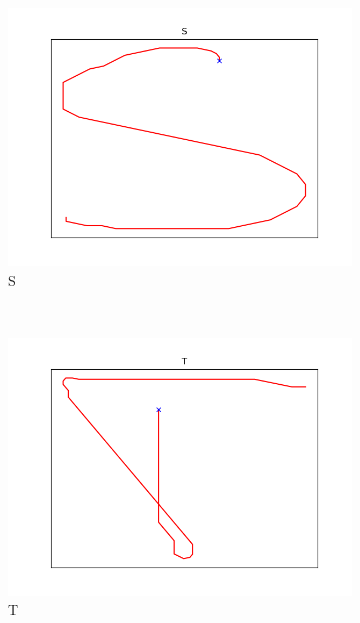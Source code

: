\begin{figure}
\begin{subfigure}[b]{0.14\textwidth}
        \includegraphics[width=\textwidth]{images/gbem/letters_generated/S.png}
        \caption{S}
    \end{subfigure}
    ~
    \begin{subfigure}[b]{0.14\textwidth}
        \includegraphics[width=\textwidth]{images/gbem/letters_generated/T.png}
        \caption{T}
    \end{subfigure}
    ~
    \begin{subfigure}[b]{0.14\textwidth}

\end{subfigure}
\end{figure}

